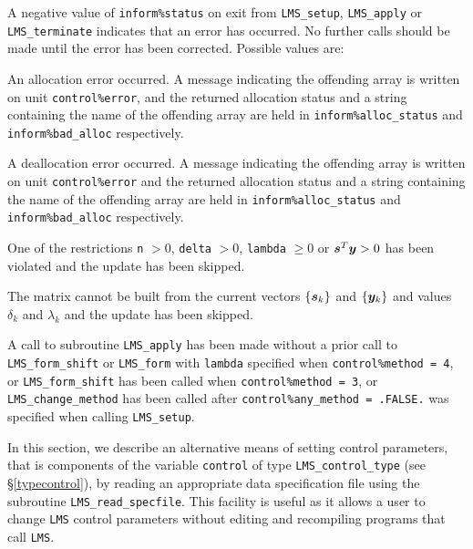 \documentclass{galahad}
\newcommand{\packagename}{LMS}
\begin{document}

\galerrors
A negative value of {\tt inform\%status} on exit from
{\tt \packagename\_setup},
{\tt \packagename\_apply}
or
{\tt \packagename\_terminate}
indicates that an error has occurred. No further calls should be made
until the error has been corrected. Possible values are:

\begin{description}

 An allocation error occurred.
A message indicating the offending
array is written on unit {\tt control\%error}, and the returned allocation
status and a string containing the name of the offending array
are held in {\tt inform\%alloc\_\-status}
and {\tt inform\%bad\_alloc} respectively.

 A deallocation error occurred.
A message indicating the offending
array is written on unit {\tt control\%error} and the returned allocation
status and a string containing the name of the offending array
are held in {\tt inform\%alloc\_\-status}
and {\tt inform\%bad\_alloc} respectively.

 One of the restrictions
  {\tt n} $> 0$,  {\tt delta} $> 0$, {\tt lambda} $\geq 0$ or
  ${\bm{s}}^T {\bm{y}} > 0$ has been violated and the update has
  been skipped.

 The matrix cannot be built
 from the current vectors $\{{\bm{s}}_k\}$ and $\{{\bm{y}}_k\}$ and values
 $\delta_k$ and $\lambda_k$ and the update has been skipped.

 A call to subroutine
{\tt \packagename\_apply} has been made without a prior call to
{\tt \packagename\_form\_shift} or
{\tt \packagename\_form} with {\tt lambda} specified
 when {\tt control\%method = 4},
 or {\tt \packagename\_form\_shift} has been called when
{\tt control\%method = 3}, or
{\tt \packagename\_change\_method} has been called after
{\tt control\%any\_method = .FALSE.} was specified when
calling {\tt \packagename\_setup}.

\vspace*{1mm}


\end{description}


\galfeatures
\noindent In this section, we describe an alternative means of setting
control parameters, that is components of the variable {\tt control} of type
{\tt \packagename\_control\_type}
(see \S\ref{typecontrol}),
by reading an appropriate data specification file using the
subroutine {\tt \packagename\_read\_specfile}. This facility
is useful as it allows a user to change  {\tt \packagename} control parameters
without editing and recompiling programs that call {\tt \packagename}.
\end{document}
